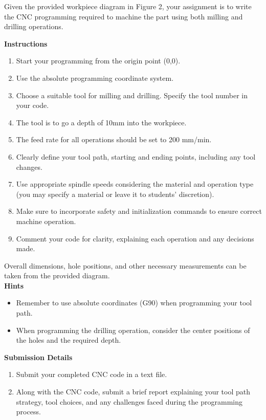 \documentclass{article}
\begin{document}
Given the provided workpiece diagram in Figure 2, your assignment is to write the CNC programming required to machine the part using both milling and drilling operations.

\textbf{Instructions}

\begin{enumerate}
    \item Start your programming from the origin point (0,0).
    \item Use the absolute programming coordinate system.
    \item Choose a suitable tool for milling and drilling. Specify the tool number in your code.
    \item The tool is to go a depth of 10mm into the workpiece.
    \item The feed rate for all operations should be set to 200 mm/min.
    \item Clearly define your tool path, starting and ending points, including any tool changes.
    \item Use appropriate spindle speeds considering the material and operation type (you may specify a material or leave it to students' discretion).
    \item Make sure to incorporate safety and initialization commands to ensure correct machine operation.
    \item Comment your code for clarity, explaining each operation and any decisions made.
\end{enumerate}

Overall dimensions, hole positions, and other necessary measurements can be taken from the provided diagram.\\


\textbf{Hints}

\begin{itemize}
    \item Remember to use absolute coordinates (G90) when programming your tool path.
    \item When programming the drilling operation, consider the center positions of the holes and the required depth.
\end{itemize}

\textbf{Submission Details}

\begin{enumerate}
    \item Submit your completed CNC code in a text file.
    \item Along with the CNC code, submit a brief report explaining your tool path strategy, tool choices, and any challenges faced during the programming process.
\end{enumerate}
\end{document}

